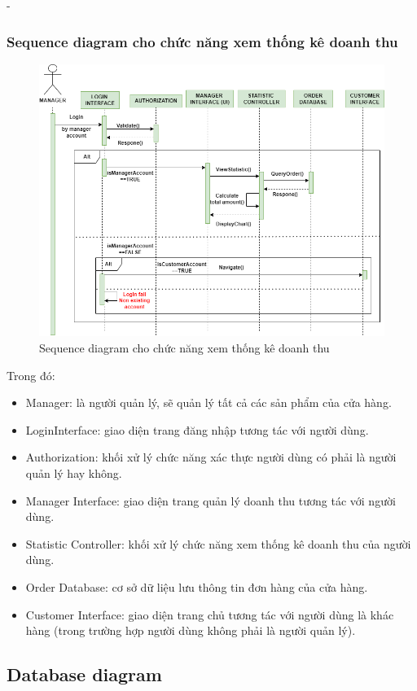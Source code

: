\begin {list} {-}{}
\subsubsection{Sequence diagram cho chức năng xem thống kê doanh thu}
\begin{figure}[h]
    \centering
    \includegraphics[scale=0.5]{images/hieu/chap-3/statistic-sequence-diagram.png}
    \caption{Sequence diagram cho chức năng xem thống kê doanh thu}
\end{figure}
Trong đó:
\begin{itemize}
    \item Manager: là người quản lý, sẽ quản lý tất cả các sản phẩm của cửa hàng.
    \item LoginInterface: giao diện trang đăng nhập tương tác với người dùng.
    \item Authorization: khối xử lý chức năng xác thực người dùng có phải là người quản lý hay không.
    \item Manager Interface: giao diện trang quản lý doanh thu tương tác với người dùng.
    \item Statistic Controller: khối xử lý chức năng xem thống kê doanh thu của người dùng.
    \item Order Database: cơ sở dữ liệu lưu thông tin đơn hàng của cửa hàng.
    \item Customer Interface: giao diện trang chủ tương tác với người dùng là khác hàng (trong trường hợp người dùng không phải là người quản lý).
\end{itemize}
\newpage
\subsection{Database diagram}

\end{list}
